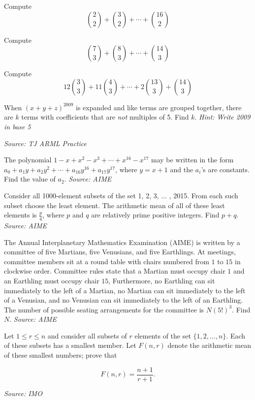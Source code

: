 \begin{problem}
Compute 
$$\binom{2}{2}+\binom{3}{2}+\cdots+\binom{16}{2}$$
\end{problem}

\begin{problem}
Compute 
$$\binom{7}{3}+\binom{8}{3}+\cdots+\binom{14}{3}$$
\end{problem}

\begin{problem}
Compute
$$12\binom{3}{3}+11\binom{4}{3}+\cdots+2\binom{13}{3}+\binom{14}{3}$$
\end{problem}

\begin{problem}
When $(x+y+z)^{2009}$ is expanded and like terms are grouped together, there are $k$ terms with coefficients that are \textit{not} multiples of 5. Find $k$. \textit{Hint: Write 2009 in base 5}

\textit{Source: TJ ARML Practice}
\end{problem} 

\begin{problem}
The polynomial $1-x+x^2-x^3+\cdots+x^{16}-x^{17}$ may be written in the form $a_0+a_1y+a_2y^2+\cdots +a_{16}y^{16}+a_{17}y^{17}$, where $y=x+1$ and the $a_i$'s are constants. Find the value of $a_2$. \textit{Source: AIME}
\end{problem}

\begin{problem}
Consider all 1000-element subsets of the set {1, 2, 3, ... , 2015}. From each such subset choose the least element. The arithmetic mean of all of these least elements is $\frac{p}{q}$, where $p$ and $q$ are relatively prime positive integers. Find $p + q$. \textit{Source: AIME}
\label{p1}
\end{problem}

\begin{problem}
The Annual Interplanetary Mathematics Examination (AIME) is written by a committee of five Martians, five Venusians, and five Earthlings. At meetings, committee members sit at a round table with chairs numbered from $1$ to $15$ in clockwise order. Committee rules state that a Martian must occupy chair $1$ and an Earthling must occupy chair $15$, Furthermore, no Earthling can sit immediately to the left of a Martian, no Martian can sit immediately to the left of a Venusian, and no Venusian can sit immediately to the left of an Earthling. The number of possible seating arrangements for the committee is $N(5!)^3$. Find $N$. \textit{Source: AIME}
\end{problem}

\begin{problem}
Let $1 \le r \le n$ and consider all subsets of $r$ elements of the set $\{ 1, 2, \ldots , n \}$. Each of these subsets has a smallest member. Let $F(n,r)$ denote the arithmetic mean of these smallest numbers; prove that

$$F(n,r) = \frac{n+1}{r+1}.$$

\textit{Source: IMO}
\end{problem}